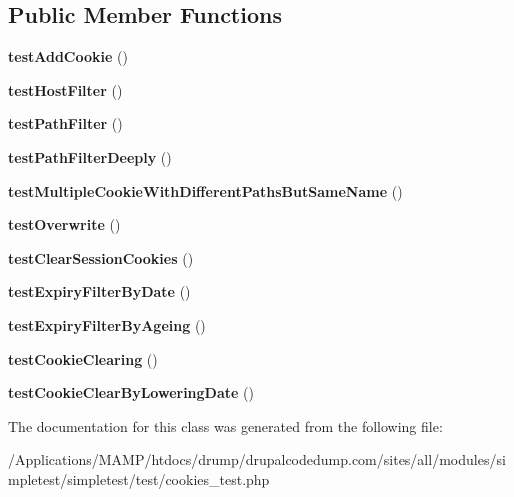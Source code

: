 \subsection*{Public Member Functions}
\begin{DoxyCompactItemize}
\item 
\hypertarget{class_test_of_cookie_jar_a2b136e67adb21b966235eecb61185357}{
{\bfseries testAddCookie} ()}
\label{class_test_of_cookie_jar_a2b136e67adb21b966235eecb61185357}

\item 
\hypertarget{class_test_of_cookie_jar_a96f7a8ee4d4844eabc5f60f181894925}{
{\bfseries testHostFilter} ()}
\label{class_test_of_cookie_jar_a96f7a8ee4d4844eabc5f60f181894925}

\item 
\hypertarget{class_test_of_cookie_jar_afb9db15c0cd5612e52006d2a6ddd7def}{
{\bfseries testPathFilter} ()}
\label{class_test_of_cookie_jar_afb9db15c0cd5612e52006d2a6ddd7def}

\item 
\hypertarget{class_test_of_cookie_jar_ab6c4a4e587399036e7baeacf3e074775}{
{\bfseries testPathFilterDeeply} ()}
\label{class_test_of_cookie_jar_ab6c4a4e587399036e7baeacf3e074775}

\item 
\hypertarget{class_test_of_cookie_jar_a7fb21fc1d819c5984d90d6d3151ebb1b}{
{\bfseries testMultipleCookieWithDifferentPathsButSameName} ()}
\label{class_test_of_cookie_jar_a7fb21fc1d819c5984d90d6d3151ebb1b}

\item 
\hypertarget{class_test_of_cookie_jar_a95ccfb4c6dd5007196ba45d57f12e712}{
{\bfseries testOverwrite} ()}
\label{class_test_of_cookie_jar_a95ccfb4c6dd5007196ba45d57f12e712}

\item 
\hypertarget{class_test_of_cookie_jar_a54f7d03a6236cd4daac2f37c23e66c3d}{
{\bfseries testClearSessionCookies} ()}
\label{class_test_of_cookie_jar_a54f7d03a6236cd4daac2f37c23e66c3d}

\item 
\hypertarget{class_test_of_cookie_jar_a99ed8751584cdddeda0b3c72c06ae81e}{
{\bfseries testExpiryFilterByDate} ()}
\label{class_test_of_cookie_jar_a99ed8751584cdddeda0b3c72c06ae81e}

\item 
\hypertarget{class_test_of_cookie_jar_a70ab8713b055c32b58c06ad87b735d75}{
{\bfseries testExpiryFilterByAgeing} ()}
\label{class_test_of_cookie_jar_a70ab8713b055c32b58c06ad87b735d75}

\item 
\hypertarget{class_test_of_cookie_jar_a1d5b392274c1d9b21e25c2a56e3f5601}{
{\bfseries testCookieClearing} ()}
\label{class_test_of_cookie_jar_a1d5b392274c1d9b21e25c2a56e3f5601}

\item 
\hypertarget{class_test_of_cookie_jar_a3bbb0ec3c4de230c69f490ee486196cb}{
{\bfseries testCookieClearByLoweringDate} ()}
\label{class_test_of_cookie_jar_a3bbb0ec3c4de230c69f490ee486196cb}

\end{DoxyCompactItemize}


The documentation for this class was generated from the following file:\begin{DoxyCompactItemize}
\item 
/Applications/MAMP/htdocs/drump/drupalcodedump.com/sites/all/modules/simpletest/simpletest/test/cookies\_\-test.php\end{DoxyCompactItemize}
